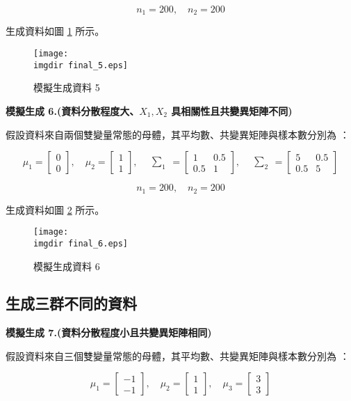 \[n_1 = 200, \quad n_2 = 200\]

生成資料如圖 \ref{fig:final_5} 所示。
\begin{figure}[H]
    \centering
        \texttt{[image: \\imgdir final\_5.eps]}
    \caption{模擬生成資料 5}
    \label{fig:final_5}
\end{figure}

\textbf{\large 模擬生成 6.(資料分散程度大、$X_1, X_2$ 具相關性且共變異矩陣不同)}

假設資料來自兩個雙變量常態的母體，其平均數、共變異矩陣與樣本數分別為 ：

\[\mu_1 = \begin{bmatrix}
0 \\
0
\end{bmatrix}, \quad \mu_2 = \begin{bmatrix}
1 \\
1
\end{bmatrix}, \quad \begin{matrix} \sum_{1} \end{matrix} = \begin{bmatrix}
1 & 0.5\\
0.5 & 1
\end{bmatrix}, \quad \begin{matrix} \sum_{2} \end{matrix} = \begin{bmatrix}
5 & 0.5\\
0.5 & 5
\end{bmatrix}\]

\[n_1 = 200, \quad n_2 = 200\]

生成資料如圖 \ref{fig:final_6} 所示。
\begin{figure}[H]
    \centering
        \texttt{[image: \\imgdir final\_6.eps]}
    \caption{模擬生成資料 6}
    \label{fig:final_6}
\end{figure}

\subsection{生成三群不同的資料}

\textbf{\large 模擬生成 7.(資料分散程度小且共變異矩陣相同)}

假設資料來自三個雙變量常態的母體，其平均數、共變異矩陣與樣本數分別為 ：

\[\mu_1 = \begin{bmatrix}
-1 \\
-1
\end{bmatrix}, \quad \mu_2 = \begin{bmatrix}
1 \\
1
\end{bmatrix}, \quad \mu_3 = \begin{bmatrix}
3 \\
3
\end{bmatrix}\]

